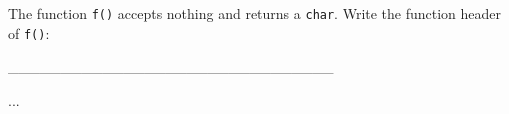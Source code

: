 The function \texttt{f()} accepts nothing and returns a \texttt{char}. Write the function header of \texttt{f()}:



\begin{consolethree}[escapeinside=||]

_______________________________

{

    ...

}

\end{consolethree}


